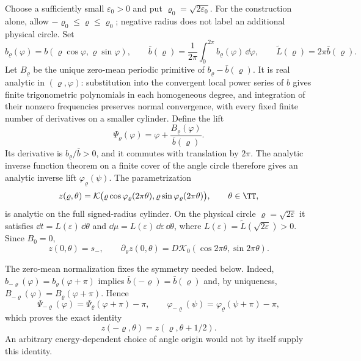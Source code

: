 Choose a sufficiently small $\varepsilon_0>0$ and put
$\varrho_0=\sqrt{2\varepsilon_0}$.  For the construction alone, allow
$-\varrho_0\leq\varrho\leq\varrho_0$; negative radius does not label an
additional physical circle.  Set
\[
 b_\varrho(\varphi)=b(\varrho\cos\varphi,\varrho\sin\varphi),\qquad
 \bar b(\varrho)=\frac1{2\pi}\int_0^{2\pi}b_\varrho(\varphi)\,\dd\varphi,
 \qquad \widetilde L(\varrho)=2\pi\bar b(\varrho).
\]
Let $B_\varrho$ be the unique zero-mean periodic primitive of
$b_\varrho-\bar b(\varrho)$.  It is real analytic in $(\varrho,\varphi)$:
substitution into the convergent local power series of $b$ gives finite
trigonometric polynomials in each homogeneous degree, and integration of
their nonzero frequencies preserves normal convergence, with every fixed
finite number of derivatives on a smaller cylinder.  Define the lift
\[
 \Psi_\varrho(\varphi)
   =\varphi+\frac{B_\varrho(\varphi)}{\bar b(\varrho)}.
\]
Its derivative is $b_\varrho/\bar b>0$, and it commutes with translation
by $2\pi$.  The analytic inverse function theorem on a finite cover of
the angle circle therefore gives an analytic inverse lift
$\varphi_\varrho(\psi)$.  The parametrization
\begin{equation}\label{ell:time-angle}
 z(\varrho,\theta)=\mathcal K\bigl(
 \varrho\cos\varphi_\varrho(2\pi\theta),
 \varrho\sin\varphi_\varrho(2\pi\theta)\bigr),\qquad \theta\in\TT,
\end{equation}
is analytic on the full signed-radius cylinder.  On the physical circle
$\varrho=\sqrt{2\varepsilon}$ it satisfies
$\dd t=L(\varepsilon)\,\dd\theta$ and
$\dd\mu=L(\varepsilon)\,\dd\varepsilon\,\dd\theta$, where
$L(\varepsilon)=\widetilde L(\sqrt{2\varepsilon})>0$.
Since $B_0=0$,
\begin{equation}\label{ell:angle-first-jet}
 z(0,\theta)=s_-,\qquad
 \partial_\varrho z(0,\theta)
   =D\mathcal K_0(\cos2\pi\theta,\sin2\pi\theta).
\end{equation}

The zero-mean normalization fixes the symmetry needed below.
Indeed, $b_{-\varrho}(\varphi)=b_\varrho(\varphi+\pi)$ implies
$\bar b(-\varrho)=\bar b(\varrho)$ and, by uniqueness,
$B_{-\varrho}(\varphi)=B_\varrho(\varphi+\pi)$.  Hence
\[
 \Psi_{-\varrho}(\varphi)=\Psi_\varrho(\varphi+\pi)-\pi,
 \qquad
 \varphi_{-\varrho}(\psi)=\varphi_\varrho(\psi+\pi)-\pi,
\]
which proves the exact identity
\begin{equation}\label{ell:half-turn}
 z(-\varrho,\theta)=z(\varrho,\theta+1/2).
\end{equation}
An arbitrary energy-dependent choice of angle origin would not by itself
supply this identity.


